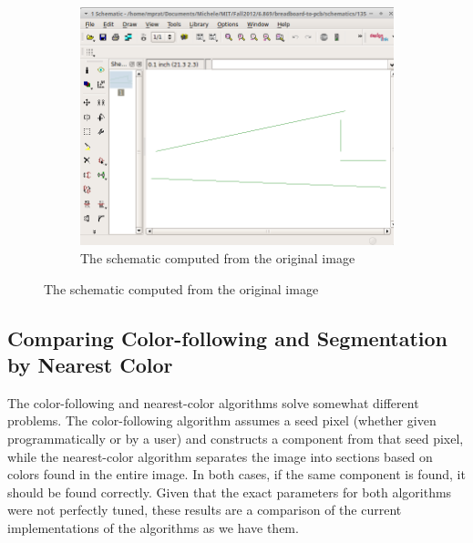 \documentclass[10pt,twocolumn,letterpaper]{article}
\begin{document}
\begin{figure}[ht]
\begin{subfigure}[b]{\linewidth}
	\centering
   \includegraphics[width=0.9\linewidth]{demos/full_pipeline2_schematic.png}
	\caption{The schematic computed from the original image}
	\label{fig:schemfull}
\end{subfigure}
\end{figure}

\subsection{Comparing Color-following and Segmentation by Nearest Color}

The color-following and nearest-color algorithms solve somewhat different
problems. The color-following algorithm assumes a seed pixel (whether given
programmatically or by a user) and constructs a component from that seed pixel,
while the nearest-color algorithm separates the image into sections based on
colors found in the entire image. In both cases, if the same component is
found, it should be found correctly. Given that the exact parameters for both
algorithms were not perfectly tuned, these results are a comparison of the
current implementations of the algorithms as we have them.
\end{document}
